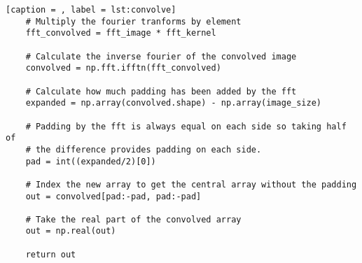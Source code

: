 \documentclass[a4paper,10pt]{article}
\begin{document}
\begin{lstlisting}[caption = , label = lst:convolve]
    # Multiply the fourier tranforms by element
    fft_convolved = fft_image * fft_kernel

    # Calculate the inverse fourier of the convolved image
    convolved = np.fft.ifftn(fft_convolved)

    # Calculate how much padding has been added by the fft
    expanded = np.array(convolved.shape) - np.array(image_size)

    # Padding by the fft is always equal on each side so taking half of
    # the difference provides padding on each side.
    pad = int((expanded/2)[0])

    # Index the new array to get the central array without the padding
    out = convolved[pad:-pad, pad:-pad]

    # Take the real part of the convolved array
    out = np.real(out)

    return out
\end{lstlisting}
\end{document}
